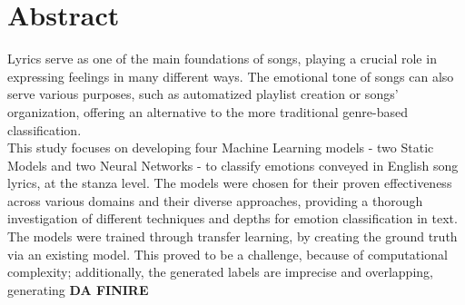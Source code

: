 \firstchapter
\chapter*{Abstract}
\label{ch:abstract}
Lyrics serve as one of the main foundations of songs, playing a crucial role in
expressing feelings in many different ways.
The emotional tone of songs can also serve various purposes, such as
automatized playlist creation or songs' organization,
offering an alternative to the more traditional genre-based classification.\\

This study focuses on developing four Machine Learning models - two Static Models
and two Neural Networks - to classify emotions conveyed in English song lyrics,
at the stanza level.
The models were chosen for their proven effectiveness across various domains and
their diverse approaches, providing a thorough investigation of different
techniques and depths for emotion classification in text.\\

The models were trained through transfer learning, by creating the ground truth
via an existing model. This proved to be a challenge, because of computational
complexity; additionally, the generated labels are imprecise and overlapping,
generating \textbf{DA FINIRE}
